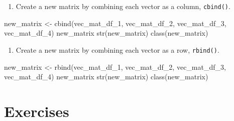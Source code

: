 \documentclass[
  letterpaper,
  DIV=11,
  numbers=noendperiod]{scrreprt}
\newenvironment{Shaded}{}{}
\newcommand{\FunctionTok}[1]{\textcolor[rgb]{0.44,0.26,0.76}{#1}}
\newcommand{\NormalTok}[1]{\textcolor[rgb]{0.14,0.16,0.18}{#1}}
\newcommand{\OtherTok}[1]{\textcolor[rgb]{0.44,0.26,0.76}{#1}}
\providecommand{\tightlist}{%
  \setlength{\itemsep}{0pt}\setlength{\parskip}{0pt}}\usepackage{longtable,booktabs,array}
\begin{document}
\begin{enumerate}
\def\labelenumi{\arabic{enumi}.}
\setcounter{enumi}{1}
\tightlist
\item
  Create a new matrix by combining each vector as a column,
  \texttt{cbind()}.
\end{enumerate}

\begin{Shaded}
\begin{Highlighting}[]
\NormalTok{new\_matrix }\OtherTok{\textless{}{-}} \FunctionTok{cbind}\NormalTok{(vec\_mat\_df\_1, vec\_mat\_df\_2, vec\_mat\_df\_3, vec\_mat\_df\_4)}
\NormalTok{new\_matrix}
\FunctionTok{str}\NormalTok{(new\_matrix)}
\FunctionTok{class}\NormalTok{(new\_matrix)}
\end{Highlighting}
\end{Shaded}

\begin{enumerate}
\def\labelenumi{\arabic{enumi}.}
\setcounter{enumi}{2}
\tightlist
\item
  Create a new matrix by combining each vector as a row,
  \texttt{rbind()}.
\end{enumerate}

\begin{Shaded}
\begin{Highlighting}[]
\NormalTok{new\_matrix }\OtherTok{\textless{}{-}} \FunctionTok{rbind}\NormalTok{(vec\_mat\_df\_1, vec\_mat\_df\_2, vec\_mat\_df\_3, vec\_mat\_df\_4)}
\NormalTok{new\_matrix}
\FunctionTok{str}\NormalTok{(new\_matrix)}
\FunctionTok{class}\NormalTok{(new\_matrix)}
\end{Highlighting}
\end{Shaded}

\section{Exercises}\label{exercises-8}
\end{document}
